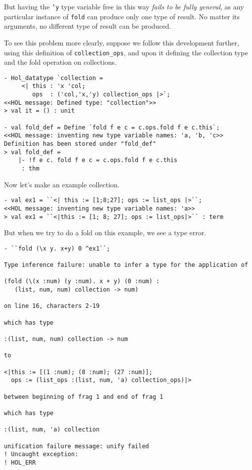 But having the \texttt{'y} type variable free in this way {\it fails to be fully general},
as any particular instance of \texttt{fold} can produce only one type of result.
No matter its arguments, no different type of result can be produced.

To see this problem more clearly, suppose we follow this development further,
using this definition of \texttt{collection\_ops}, and upon it defining the collection
type and the fold operation on collections.
\begin{session}
\begin{verbatim}
- Hol_datatype `collection =
     <| this : 'x 'col;
        ops  : ('col,'x,'y) collection_ops |>`;
<<HOL message: Defined type: "collection">>
> val it = () : unit

- val fold_def = Define `fold f e c = c.ops.fold f e c.this`;
<<HOL message: inventing new type variable names: 'a, 'b, 'c>>
Definition has been stored under "fold_def"
> val fold_def =
    |- !f e c. fold f e c = c.ops.fold f e c.this
     : thm
\end{verbatim}
\end{session}

Now let's make an example collection.
\begin{session}
\begin{verbatim}
- val ex1 = ``<| this := [1;8;27]; ops := list_ops |>``;
<<HOL message: inventing new type variable names: 'a>>
> val ex1 = ``<|this := [1; 8; 27]; ops := list_ops|>`` : term
\end{verbatim}
\end{session}

\newpage
But when we try to do a fold on this example, we see a type error.
\begin{session}
\begin{verbatim}
- ``fold (\x y. x+y) 0 ^ex1``;

Type inference failure: unable to infer a type for the application of

(fold (\(x :num) (y :num). x + y) (0 :num) :
   (list, num, num) collection -> num)

on line 16, characters 2-19

which has type

:(list, num, num) collection -> num

to

<|this := [(1 :num); (8 :num); (27 :num)];
  ops := (list_ops :(list, num, 'a) collection_ops)|>

between beginning of frag 1 and end of frag 1

which has type

:(list, num, 'a) collection

unification failure message: unify failed
! Uncaught exception: 
! HOL_ERR
\end{verbatim}
\end{session}

